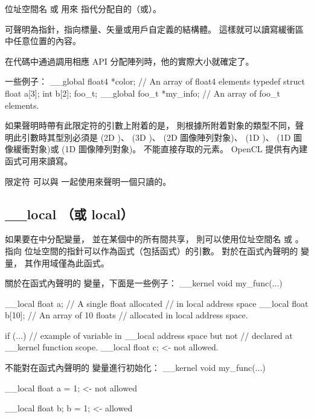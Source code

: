 位址空間名  或  用來
指代分配自的（或）。

 可聲明為指針，指向標量、矢量或用戶自定義的結構體。
這樣就可以讀寫緩衝區中任意位置的內容。

在代碼中通過調用相應 API 分配陣列時，他的實際大小就確定了。

一些例子：
\startclc
__global float4	*color;		// An array of float4 elements
typedef struct {
	float	a[3];
	int	b[2];
} foo_t;
__global foo_t	*my_info;	// An array of foo_t elements.
\stopclc

如果聲明時帶有此限定符的引數上附着的是，
則根據所附着對象的類型不同，聲明此引數時其型別必須是
  (2D )、  (3D )、
  (2D 圖像陣列對象)、  (1D )、
  (1D 圖像緩衝對象)或  (1D 圖像陣列對象)。
不能直接存取的元素。 OpenCL 提供有內建函式可用來讀寫。

限定符  可以與  一起使用來聲明一個只讀的。

\subsection{__local （或 local）}

如果要在中分配變量，
並在某個中的所有間共享，
則可以使用位址空間名  或 。
指向  位址空間的指針可以作為函式（包括函式）的引數。
對於在函式內聲明的  變量，
其作用域僅為此函式。

關於在函式內聲明的  變量，下面是一些例子：
\startclc
__kernel void my_func(...)
{
	__local float	a;	// A single float allocated
				// in local address space
	__local float	b[10];	// An array of 10 floats
				// allocated in local address space.

	if (...)
	{
		// example of variable in __local address space but not
		// declared at __kernel function scope.
		__local float	c;	<- not allowed.
	}
}
\stopclc

不能對在函式內聲明的  變量進行初始化：
\startclc
__kernel void my_func(...)
{
	__local float	a = 1;	<- not allowed

	__local float	b;
	b = 1;			<- allowed
}
\stopclc

